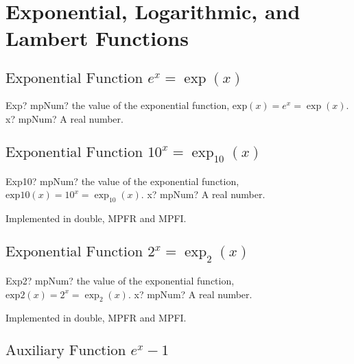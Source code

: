 \section{Exponential, Logarithmic, and Lambert Functions}

\subsection{\texorpdfstring{$\text{Exponential Function }e^x = \exp(x)$}{exp}}

\begin{mpFunctionsExtract}
	\mpFunctionOne
	{Exp? mpNum? the value of the exponential function,  $\text{exp}(x) = e^x = \exp(x)$.}
	{x? mpNum? A real number.}
\end{mpFunctionsExtract}





\subsection{\texorpdfstring{$\text{Exponential Function }10^x = \exp_{10}(x)$}{exp10}}

\begin{mpFunctionsExtract}
	\mpFunctionOne
	{Exp10? mpNum? the value of the exponential function, $\text{exp10}(x) = 10^x = \exp_{10}(x)$.}
	{x? mpNum? A real number.}
\end{mpFunctionsExtract}

Implemented in double, MPFR and MPFI.



\subsection{\texorpdfstring{$\text{Exponential Function }2^x = \exp_2(x)$}{exp2}}

\begin{mpFunctionsExtract}
	\mpFunctionOne
	{Exp2? mpNum? the value of the exponential function, $\text{exp2}(x) = 2^x = \exp_2(x)$.}
	{x? mpNum? A real number.}
\end{mpFunctionsExtract}

Implemented in double, MPFR and MPFI.



\subsection{\texorpdfstring{$\text{Auxiliary Function }e^{x}-1$}{expm1}}

